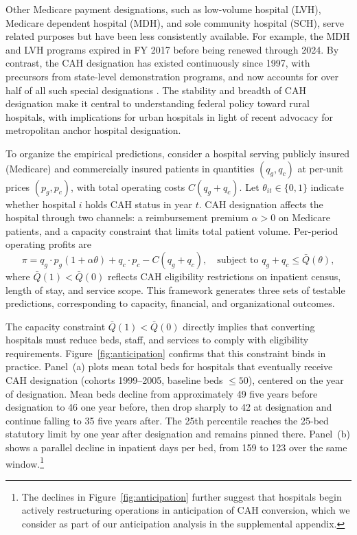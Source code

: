 \documentclass[a4paper, 12pt, twoside]{article}
\begin{document}
Other Medicare payment designations, such as low-volume hospital (LVH), Medicare dependent hospital (MDH), and sole community hospital (SCH), serve related purposes but have been less consistently available. For example, the MDH and LVH programs expired in FY 2017 before being renewed through 2024. By contrast, the CAH designation has existed continuously since 1997, with precursors from state-level demonstration programs, and now accounts for over half of all such special designations \citep{crs2023}. The stability and breadth of CAH designation make it central to understanding federal policy toward rural hospitals, with implications for urban hospitals in light of recent advocacy for metropolitan anchor hospital designation.

To organize the empirical predictions, consider a hospital serving publicly insured (Medicare) and commercially insured patients in quantities $(q_g, q_c)$ at per-unit prices $(p_g, p_c)$, with total operating costs $C(q_g + q_c)$. Let $\theta_{it} \in \{0,1\}$ indicate whether hospital $i$ holds CAH status in year $t$. CAH designation affects the hospital through two channels: a reimbursement premium $\alpha > 0$ on Medicare patients, and a capacity constraint that limits total patient volume. Per-period operating profits are
\begin{equation}
\pi = q_g \cdot p_g(1 + \alpha\theta) + q_c \cdot p_c - C(q_g + q_c), \quad \text{subject to } q_g + q_c \leq \bar{Q}(\theta),
\label{eq:cah_profit}
\end{equation}
where $\bar{Q}(1) < \bar{Q}(0)$ reflects CAH eligibility restrictions on inpatient census, length of stay, and service scope. This framework generates three sets of testable predictions, corresponding to capacity, financial, and organizational outcomes.

The capacity constraint $\bar{Q}(1) < \bar{Q}(0)$ directly implies that converting hospitals must reduce beds, staff, and services to comply with eligibility requirements. Figure~\ref{fig:anticipation} confirms that this constraint binds in practice. Panel~(a) plots mean total beds for hospitals that eventually receive CAH designation (cohorts 1999--2005, baseline beds $\leq 50$), centered on the year of designation. Mean beds decline from approximately 49 five years before designation to 46 one year before, then drop sharply to 42 at designation and continue falling to 35 five years after. The 25th percentile reaches the 25-bed statutory limit by one year after designation and remains pinned there. Panel~(b) shows a parallel decline in inpatient days per bed, from 159 to 123 over the same window.\footnote{The declines in Figure~\ref{fig:anticipation} further suggest that hospitals begin actively restructuring operations in anticipation of CAH conversion, which we consider as part of our anticipation analysis in the supplemental appendix.}
\end{document}
